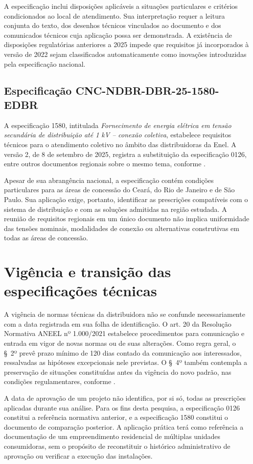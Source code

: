 A especificação inclui disposições aplicáveis a situações particulares e critérios condicionados ao local de atendimento. Sua interpretação requer a leitura conjunta do texto, dos desenhos técnicos vinculados ao documento e dos comunicados técnicos cuja aplicação possa ser demonstrada. A existência de disposições regulatórias anteriores a 2025 impede que requisitos já incorporados à versão de 2022 sejam classificados automaticamente como inovações introduzidas pela especificação nacional.

\subsection{Especificação CNC-NDBR-DBR-25-1580-EDBR}
\label{subsec:1580}

A especificação 1580, intitulada \emph{Fornecimento de energia elétrica em tensão secundária de distribuição até 1 kV -- conexão coletiva}, estabelece requisitos técnicos para o atendimento coletivo no âmbito das distribuidoras da Enel. A versão 2, de 8 de setembro de 2025, registra a substituição da especificação 0126, entre outros documentos regionais sobre o mesmo tema, conforme .

Apesar de sua abrangência nacional, a especificação contém condições particulares para as áreas de concessão do Ceará, do Rio de Janeiro e de São Paulo. Sua aplicação exige, portanto, identificar as prescrições compatíveis com o sistema de distribuição e com as soluções admitidas na região estudada. A reunião de requisitos regionais em um único documento não implica uniformidade das tensões nominais, modalidades de conexão ou alternativas construtivas em todas as áreas de concessão.

\section{Vigência e transição das especificações técnicas}
\label{sec:transicao}

A vigência de normas técnicas da distribuidora não se confunde necessariamente com a data registrada em sua folha de identificação. O art. 20 da Resolução Normativa ANEEL nº 1.000/2021 estabelece procedimentos para comunicação e entrada em vigor de novas normas ou de suas alterações. Como regra geral, o §~2º prevê prazo mínimo de 120 dias contado da comunicação aos interessados, ressalvadas as hipóteses excepcionais nele previstas. O §~4º também contempla a preservação de situações constituídas antes da vigência do novo padrão, nas condições regulamentares, conforme .

A data de aprovação de um projeto não identifica, por si só, todas as prescrições aplicadas durante sua análise. Para os fins desta pesquisa, a especificação 0126 constitui a referência normativa anterior, e a especificação 1580 constitui o documento de comparação posterior. A aplicação prática terá como referência a documentação de um empreendimento residencial de múltiplas unidades consumidoras, sem o propósito de reconstituir o histórico administrativo de aprovação ou verificar a execução das instalações.
